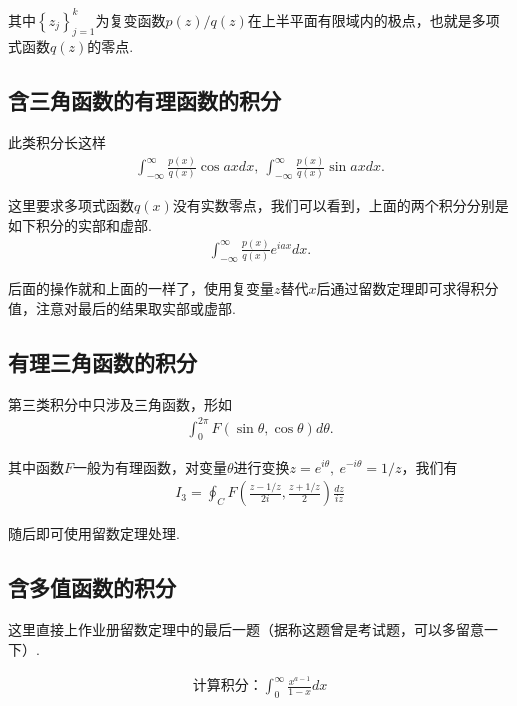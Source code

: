     其中$\left\{z_j\right\}_{j=1}^{k}$为复变函数$p(z)/q(z)$在上半平面有限域内的极点，也就是多项式函数$q(z)$的零点.

    \subsection{含三角函数的有理函数的积分}

    此类积分长这样
    \begin{align*}
        \int_{-\infty}^{\infty}\frac{p(x)}{q(x)}\cos{ax}dx,\ \int_{-\infty}^{\infty}\frac{p(x)}{q(x)}\sin{ax}dx.
    \end{align*}

    这里要求多项式函数$q(x)$没有实数零点，我们可以看到，上面的两个积分分别是如下积分的实部和虚部.
    \begin{align*}
        \int_{-\infty}^{\infty}\frac{p(x)}{q(x)}e^{iax}dx.
    \end{align*}

    后面的操作就和上面的一样了，使用复变量$z$替代$x$后通过留数定理即可求得积分值，注意对最后的结果取实部或虚部.

    \subsection{有理三角函数的积分}

    第三类积分中只涉及三角函数，形如
    \begin{align*}
        \int_{0}^{2\pi}F(\sin{\theta},\cos{\theta})d\theta.
    \end{align*}

    其中函数$F$一般为有理函数，对变量$\theta$进行变换$z=e^{i\theta},\ e^{-i\theta}=1/z$，我们有
    \begin{align*}
        I_3=\oint_{C}F\left(\frac{z-1/z}{2i}, \frac{z+1/z}{2}\right)\frac{dz}{iz}
    \end{align*}

    随后即可使用留数定理处理.

    \subsection{含多值函数的积分}

        这里直接上作业册留数定理中的最后一题（据称这题曾是考试题，可以多留意一下）.
        \begin{example}\label{ex:multi_valued}
            \begin{align*}
            \text{计算积分：}\int_0^\infty \frac{x^{a-1}}{1-x}dx
            \end{align*}
        \end{example}

